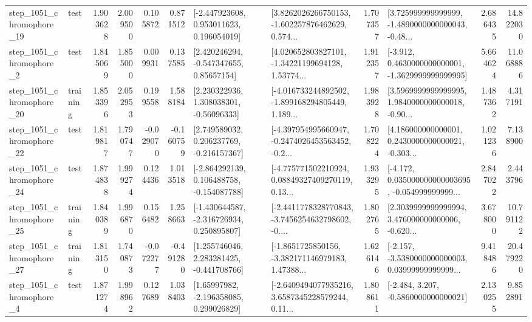 \begin{tabular}{llrrrrllrlrr}
 step\_1051\_chromophore\_19 &      test &      1.903628 &    2.009500 &      0.105872 &  0.871512 &    [-2.447923608, 0.953011623, 0.196054019] &  [3.8262026266750153, -1.602257876462629, 0.574... &       1.707357 &  [3.725999999999999, -1.4890000000000043, -0.48... &            2.686435 &         14.822030 \\
  step\_1051\_chromophore\_2 &      test &      1.845069 &    1.855000 &      0.009931 &  0.137585 &     [2.420246294, -0.547347655, 0.85657154] &  [4.020652803827101, -1.34221199694128, 1.53774... &       1.912357 &  [-3.912, 0.4630000000000001, -1.3629999999999995] &            5.664624 &         11.068886 \\
 step\_1051\_chromophore\_20 &  training &      1.853396 &    2.052953 &      0.199558 &  1.588184 &     [2.230322936, 1.308038301, -0.56096333] &  [-4.016733244892502, -1.899168294805449, 1.189... &       1.983928 &  [3.5969999999999995, 1.9840000000000018, -0.90... &            1.487362 &          4.317191 \\
 step\_1051\_chromophore\_22 &      test &      1.819817 &    1.790747 &     -0.029070 & -0.160759 &    [2.749589032, 0.206237769, -0.216157367] &  [-4.397954995660947, -0.2474026453563452, -0.2... &       1.708224 &  [4.186000000000001, 0.2430000000000021, -0.303... &            1.021236 &          7.138900 \\
 step\_1051\_chromophore\_24 &      test &      1.874838 &    1.999274 &      0.124436 &  1.013518 &   [-2.864292139, 0.106488758, -0.154087788] &  [-4.775771502210924, 0.08849327409270119, 0.13... &       1.933295 &  [-4.172, 0.035000000000003695, -0.054999999999... &            2.847022 &          2.443796 \\
 step\_1051\_chromophore\_25 &  training &      1.840389 &    1.996870 &      0.156482 &  1.258663 &   [-1.430644587, -2.316726934, 0.250895807] &  [-2.4411778328770843, -3.7456254632798602, -0.... &       1.802765 &  [2.3039999999999994, 3.476000000000006, -0.620... &            3.678000 &         10.791122 \\
 step\_1051\_chromophore\_27 &  training &      1.813150 &    1.740873 &     -0.072277 & -0.491280 &    [1.255746046, 2.283281425, -0.441708766] &  [-1.8651725850156, -3.382171146979183, 1.47388... &       1.626146 &  [-2.157, -3.5380000000000003, 0.03999999999999... &            9.418486 &         20.479220 \\
  step\_1051\_chromophore\_4 &      test &      1.871274 &    1.998962 &      0.127689 &  1.038403 &     [1.65997982, -2.196358085, 0.299026829] &  [-2.6409494077935216, 3.6587345228579244, 0.11... &       1.808611 &               [-2.484, 3.207, -0.5860000000000021] &            2.130255 &          9.852891 \\

\end{tabular}
